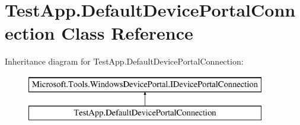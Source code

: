 \hypertarget{class_test_app_1_1_default_device_portal_connection}{}\section{Test\+App.\+Default\+Device\+Portal\+Connection Class Reference}
\label{class_test_app_1_1_default_device_portal_connection}
Inheritance diagram for Test\+App.\+Default\+Device\+Portal\+Connection\+:\begin{figure}[H]
\begin{center}
\leavevmode
\includegraphics[height=2.000000cm]{class_test_app_1_1_default_device_portal_connection}
\end{center}
\end{figure}
